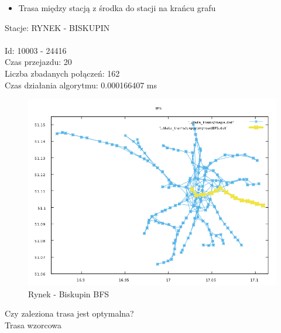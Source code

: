 \documentclass[13pt]{article}
\begin{document}
\newpage
\begin{itemize}
\item Trasa między stacją z środka do stacji na krańcu grafu
\end{itemize}
\hspace{1.5cm} Stacje: RYNEK - BISKUPIN\\\\
Id: 10003 - 24416\\
Czas przejazdu: 20\\
Liczba zbadanych połączeń: 162\\
Czas działania algorytmu: 0.000166407 ms\\
\begin{figure}[hp]
\centering
\includegraphics[width=1\textwidth]{wykresy/RYN_BIS_BFS.png}
\caption{Rynek - Biskupin BFS}
\end{figure}

Czy zaleziona trasa jest optymalna?\\
Trasa wzorcowa
\end{document}
